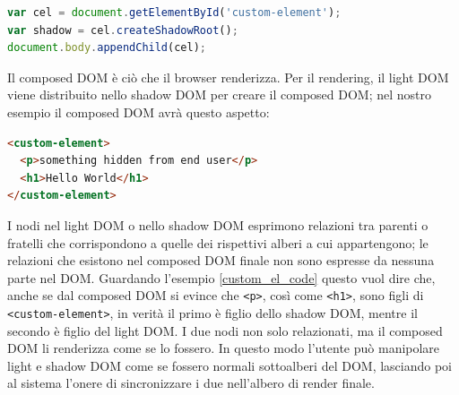 \begin{lstlisting}[language=javascript]
var cel = document.getElementById('custom-element');
var shadow = cel.createShadowRoot();
document.body.appendChild(cel);
\end{lstlisting}
Il composed DOM è ciò che il browser renderizza. Per il rendering, il light DOM viene distribuito nello shadow DOM per creare il composed DOM; nel nostro esempio il composed DOM avrà questo aspetto:
\begin{lstlisting}[language=html,label={custom_el_code}]
<custom-element>
  <p>something hidden from end user</p>
  <h1>Hello World</h1>
</custom-element>
\end{lstlisting}
I nodi nel light DOM o nello shadow DOM esprimono relazioni tra parenti o fratelli che corrispondono a quelle dei rispettivi alberi a cui appartengono; le relazioni che esistono nel composed DOM finale non sono espresse da nessuna parte nel DOM. Guardando l’esempio \ref{custom_el_code} questo vuol dire che, anche se dal composed DOM si evince che \texttt{<p>}, così come \texttt{<h1>}, sono figli di \texttt{<custom-element>}, in verità il primo è figlio dello shadow DOM, mentre il secondo è figlio del light DOM. I due nodi non solo relazionati, ma il composed DOM li renderizza come se lo fossero. In questo modo l’utente può manipolare light e shadow DOM come se fossero normali sottoalberi del DOM, lasciando poi al sistema l’onere di sincronizzare i due nell’albero di render finale.

